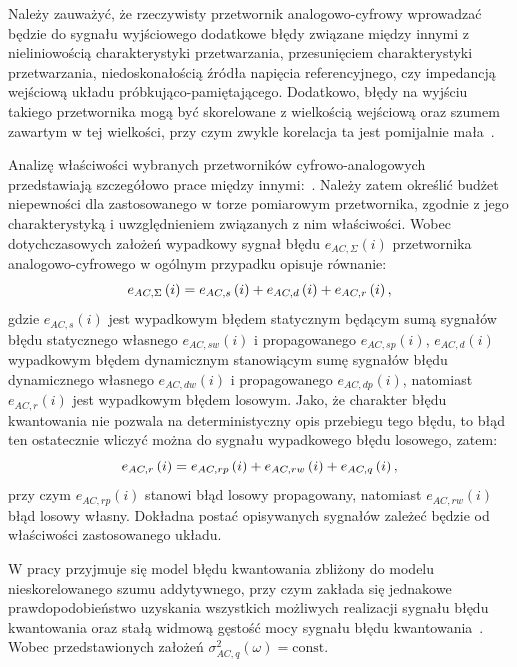 Należy zauważyć, że rzeczywisty przetwornik analogowo-cyfrowy wprowadzać będzie do sygnału wyjściowego dodatkowe błędy związane między innymi z nieliniowością charakterystyki przetwarzania, przesunięciem charakterystyki przetwarzania, niedoskonałością źródła napięcia referencyjnego, czy impedancją wejściową układu próbkująco-pamiętającego. Dodatkowo, błędy na wyjściu takiego przetwornika mogą być skorelowane z wielkością wejściową oraz szumem zawartym w tej wielkości, przy czym zwykle korelacja ta jest pomijalnie mała~\cite{sienkowski_adc}.

Analizę właściwości wybranych przetworników cyfrowo-analogowych przedstawiają szczegółowo prace między innymi:~\cite{jakubiec_system, sienkowski_adc, sienkowski_kwant, arpaia_deltasigma}. Należy zatem określić budżet niepewności dla zastosowanego w torze pomiarowym przetwornika, zgodnie z jego charakterystyką i uwzględnieniem związanych z nim właściwości. Wobec dotychczasowych założeń wypadkowy sygnał błędu $e_{AC,\Sigma}(i)$ przetwornika analogowo-cyfrowego w ogólnym przypadku opisuje równanie:
\begin{equation}
e_{AC,\Sigma} \left(i\right) = e_{AC,s} \left(i\right) + e_{AC,d} \left(i\right) + e_{AC,r} \left(i\right) \label{eq:adc_outerr},
\end{equation}
gdzie $e_{AC,s}(i)$ jest wypadkowym błędem statycznym będącym sumą sygnałów błędu statycznego własnego $e_{AC,sw}(i)$ i propagowanego $e_{AC,sp}(i)$, $e_{AC,d}(i)$ wypadkowym błędem dynamicznym stanowiącym sumę sygnałów błędu dynamicznego własnego $e_{AC,dw}(i)$ i propagowanego $e_{AC,dp}(i)$, natomiast $e_{AC,r}(i)$ jest wypadkowym błędem losowym. Jako, że charakter błędu kwantowania nie pozwala na deterministyczny opis przebiegu tego błędu, to błąd ten ostatecznie wliczyć można do sygnału wypadkowego błędu losowego, zatem:
\begin{equation}
e_{AC,r} \left(i\right) = e_{AC,rp} \left(i\right) + e_{AC,rw} \left(i\right) + e_{AC,q} \left(i\right) \label{eq:adc_rerr},
\end{equation}
przy czym $e_{AC,rp}(i)$ stanowi błąd losowy propagowany, natomiast $e_{AC,rw}(i)$ błąd losowy własny. Dokładna postać opisywanych sygnałów zależeć będzie od właściwości zastosowanego układu.

W pracy przyjmuje się model błędu kwantowania zbliżony do modelu nieskorelowanego szumu addytywnego, przy czym zakłada się jednakowe prawdopodobieństwo uzyskania wszystkich możliwych realizacji sygnału błędu kwantowania oraz stałą widmową gęstość mocy sygnału błędu kwantowania~\cite{gray_quantization, widrow_quantization}. Wobec przedstawionych założeń $\sigma_{AC,q}^{2}(\omega) = \text{const}$.

